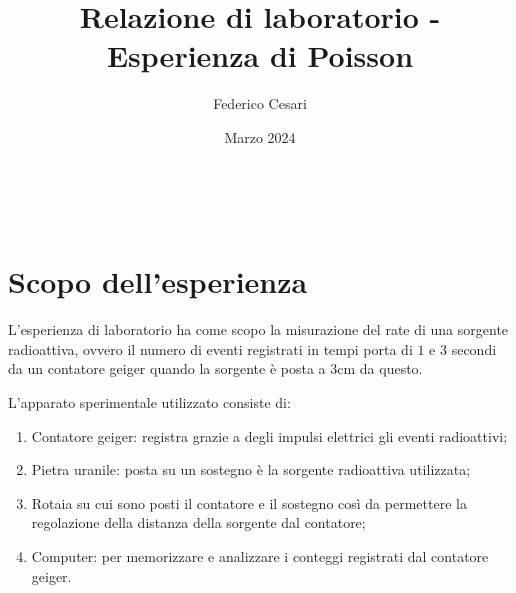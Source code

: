 \documentclass{article}
\title{Relazione di laboratorio - Esperienza di Poisson}
\author{Federico Cesari}
\date{Marzo 2024}
\begin{document}





\textcolor{white}{.}
\vfill
\section{Scopo dell'esperienza}
L'esperienza di laboratorio ha come scopo la misurazione del rate di una sorgente radioattiva, ovvero il numero di eventi registrati in tempi porta di $1$ e $3$ secondi da un contatore geiger quando la sorgente è posta a \(3\)cm da questo. 

L'apparato sperimentale utilizzato consiste di: 

\begin{enumerate}
	\item Contatore geiger: registra grazie a degli impulsi elettrici gli eventi radioattivi;
	\item Pietra uranile: posta su un sostegno è la sorgente radioattiva utilizzata;
	\item Rotaia su cui sono posti il contatore e il sostegno così da permettere la regolazione della distanza della sorgente dal contatore;
	\item Computer: per memorizzare e analizzare i conteggi registrati dal contatore geiger.
\end{enumerate}
\end{document}
